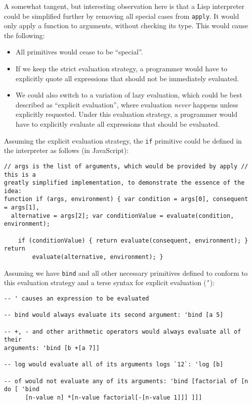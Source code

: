 A somewhat tangent, but interesting observation here is that a Lisp interpreter
could be simplified further by removing all special cases from
\texttt{apply}. It would only apply a function to arguments, without checking
its type. This would cause the following:
\begin{itemize}
	\item All primitives would cease to be ``special''.
	\item If we keep the strict evaluation strategy, a programmer would have
          to explicitly quote all expressions that should not be immediately
          evaluated.
	\item We could also switch to a variation of lazy evaluation, which
          could be best described as ``explicit evaluation'', where evaluation
          \textit{never} happens unless explicitly requested. Under this
          evaluation strategy, a programmer would have to explicitly evaluate
          all expressions that should be evaluated.
\end{itemize}

Assuming the explicit evaluation strategy, the \texttt{if} primitive could be
defined in the interpreter as follows (in JavaScript):
\begin{lstlisting}
// args is the list of arguments, which would be provided by apply // this is a
greatly simplified implementation, to demonstrate the essence of the idea:
function if (args, environment) { var condition = args[0], consequent = args[1],
  alternative = args[2]; var conditionValue = evaluate(condition, environment);
	
	if (conditionValue) { return evaluate(consequent, environment); } return
        evaluate(alternative, environment); }
\end{lstlisting}

Assuming we have \texttt{bind} and all other necessary primitives defined to
conform to this evaluation strategy and a terse syntax for explicit evaluation
(\texttt{'}):
\begin{lstlisting}
-- ' causes an expression to be evaluated

-- bind would always evaluate its second argument: 'bind [a 5]

-- +, - and other arithmetic operators would always evaluate all of their
arguments: 'bind [b +[a 7]]

-- log would evaluate all of its arguments logs `12`: 'log [b]

-- of would not evaluate any of its arguments: 'bind [factorial of [n do [ 'bind
      [n-value n] *[n-value factorial[-[n-value 1]]] ]]]
\end{lstlisting}

